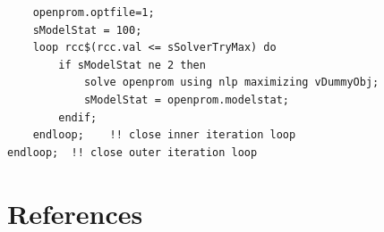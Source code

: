 \documentclass[a4paper,]{scrartcl}
\begin{document}
\begin{lstlisting}
    openprom.optfile=1;
    sModelStat = 100;
    loop rcc$(rcc.val <= sSolverTryMax) do
        if sModelStat ne 2 then
            solve openprom using nlp maximizing vDummyObj;
            sModelStat = openprom.modelstat;
        endif;
    endloop;    !! close inner iteration loop
endloop;  !! close outer iteration loop
\end{lstlisting}

\section{References}\label{references}
\end{document}
